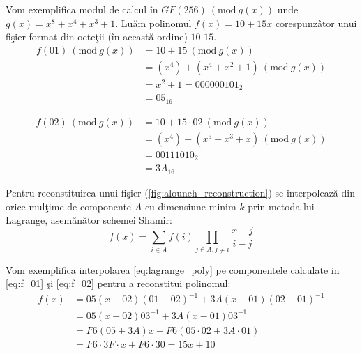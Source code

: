\documentclass{llncs}
\newcommand{\Mod}[1]{\ (\text{mod}\ #1)}
\begin{document}

\begin{example}
Vom exemplifica modul de calcul \^{i}n $GF(256) \Mod {g(x)} $ unde $g(x) = x ^ 8 + x ^ 4 + x ^ 3 + 1$. Lu\u{a}m polinomul $f(x) = 10 + 15x$ corespunz\^{a}tor unui fi\c{s}ier format din octe\c{t}ii (\^{i}n aceast\u{a} ordine) $10$ $15$.
	\begin{equation} \label{eq:f_01}
	\begin{split}
		f(01) \Mod{g(x)} & = 10 + 15 \Mod{g(x)} \\
		& = (x ^ 4) + (x ^ 4 + x ^ 2 + 1) \Mod{g(x)} \\
		& = x ^ 2 + 1 = 000000101_2 \\
		& =  05_{16}
	\end{split}
	\end{equation}

	\begin{equation} \label{eq:f_02}
	\begin{split}
	 f(02) \Mod{g(x)} & = 10 + 15\cdot02 \Mod{g(x)} \\
	 & = (x ^ 4) + (x ^ 5 + x ^ 3 + x) \Mod{g(x)} \\
	 & = 00111010_2 \\
	 & = 3A_{16}
	 \end{split}
	 \end{equation}
\end{example}
Pentru reconstituirea unui fi\c{s}ier (\ref{fig:alouneh_reconstruction}) se interpoleaz\u{a} din orice mul\c{t}ime de componente $A$ cu dimensiune minim $k$ prin metoda lui Lagrange, asem\u{a}n\u{a}tor schemei Shamir:
\begin{equation}
	\label{eq:lagrange_poly}
	f(x)=\sum_{i \in A} f(i) \prod_{j \in A, j \neq i} \frac{x-j}{i-j}
\end{equation}

\begin{example}
Vom exemplifica interpolarea \ref{eq:lagrange_poly} pe componentele calculate in  \ref{eq:f_01} \c{s}i \ref{eq:f_02} pentru a reconstitui polinomul:
	\begin{equation}
	\begin{split}
		f(x) & = 05(x - 02)(01 - 02)^{-1} + 3A(x - 01)(02 - 01)^{-1} \\
		& = 05(x - 02)03^{-1} + 3A(x - 01)03^{-1} \\
		& = F6(05 + 3A)x + F6(05\cdot02 + 3A \cdot 01) \\
		& = F6\cdot 3F\cdot x + F6\cdot30 = 15x + 10
	\end{split}
	\end{equation}
\end{example}
\end{document}
